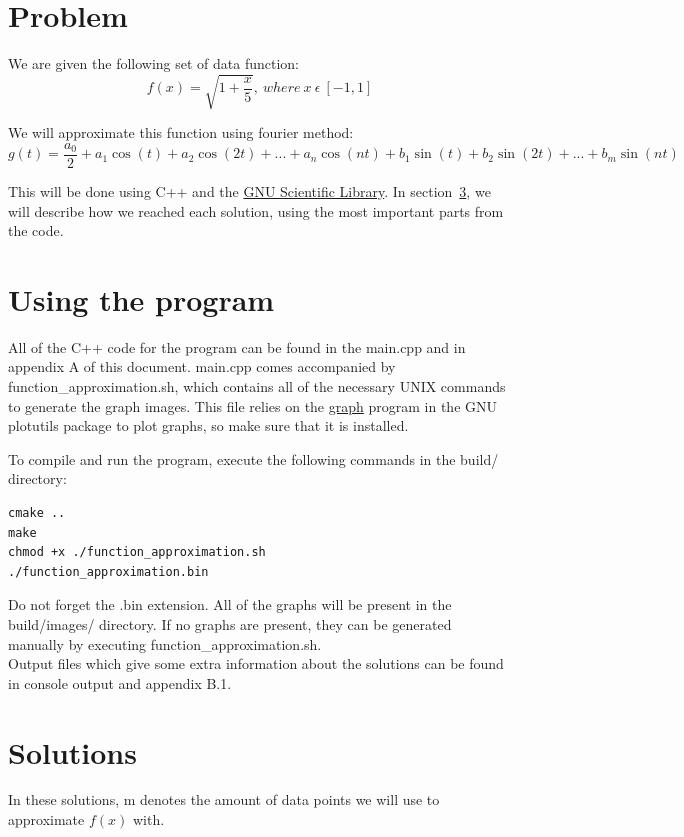 \documentclass[11pt, a4paper, titlepage, openright]{article}
\begin{document}

\tableofcontents
\newpage

\section{Problem}
    We are given the following set of data function:
    \[ f(x) = \sqrt{1 + \frac{x}{5}},\ where \ x \ \epsilon \ [-1, 1]\]

    We will approximate this function using fourier method:
    \[ g(t) = \frac{a_0}{2} + a_1 \cos (t) + a_2 \cos(2t) + ... + a_n \cos(nt) + b_1 \sin (t) + b_2 \sin (2t) + ... + b_m \sin (nt) \]


    This will be done using C++ and the \href{http://www.gnu.org/software/gsl/}{GNU Scientific Library}.
    In section~\ref{sec:solutions}, we will describe how we reached each solution, using the 
    most important parts from the code.

\bigskip
\bigskip
\section{Using the program}
    All of the C++ code for the program can be found in the main.cpp and in appendix A of this document.
    main.cpp comes accompanied by \mbox{function\_approximation.sh}, which contains all of the necessary UNIX commands to generate the graph images.
    This file relies on the \href{https://www.gnu.org/software/plotutils/manual/en/html_node/graph.html}{graph} program
    in the GNU plotutils package to plot graphs, so make sure that it is installed.

    To compile and run the program, execute the following commands in the build/ directory:
\begin{lstlisting}
cmake ..
make
chmod +x ./function_approximation.sh
./function_approximation.bin
\end{lstlisting}
    Do not forget the .bin extension. All of the graphs will be present in the build/images/ directory. If no graphs are present, they can be generated
    manually by executing function\_approximation.sh. \\
    Output files which give some extra information about the solutions can be found in console output  and appendix B.1.
    
\newpage
\section{Solutions}
\label{sec:solutions}
    In these solutions, m denotes the amount of data points we will use to approximate \( f(x) \) with.
\end{document}
